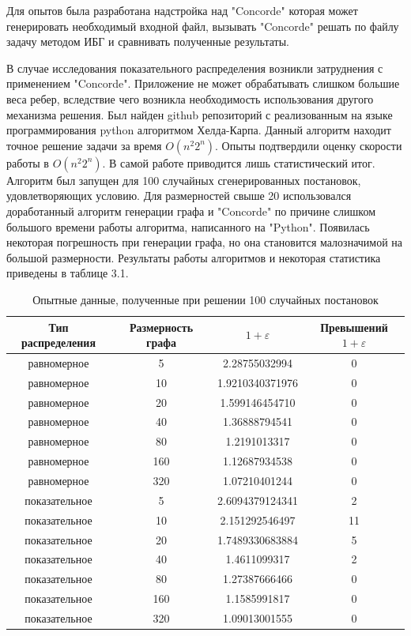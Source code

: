 \documentclass[a4paper, 14pt]{extarticle}
\numberwithin{equation}{section}
\begin{document}
Для опытов была разработана надстройка над "Concorde"  которая может генерировать необходимый входной файл, вызывать "Concorde"  решать по файлу задачу методом ИБГ и сравнивать полученные результаты.

В случае исследования показательного распределения возникли затруднения с применением "Concorde". Приложение не может обрабатывать слишком большие веса ребер, вследствие чего возникла необходимость использования другого механизма решения. Был найден github репозиторий с реализованным на языке программирования python алгоритмом Хелда-Карпа. Данный алгоритм находит точное решение задачи за время $O(n^2 2^n)$. Опыты подтвердили оценку скорости работы в $O(n^2 2^n)$. В самой работе приводится лишь статистический итог. Алгоритм был запущен для 100 случайных сгенерированных постановок, удовлетворяющих условию. Для размерностей свыше 20 использовался доработанный алгоритм генерации графа и "Concorde" по причине слишком большого времени работы алгоритма, написанного на "Python". Появилась некоторая погрешность при генерации графа, но она становится малозначимой на большой размерности. Результаты работы алгоритмов и некоторая статистика приведены в таблице 3.1.\\

\begin{table}
\caption{Опытные данные, полученные при решении 100 случайных постановок}
\begin{center}
 \begin{tabular}{||c | c | c | c||} 
 \hline
 Тип распределения & Размерность графа  & $1+\varepsilon$  & Превышений $1+\varepsilon$ \\ [0.5ex] 
 \hline\hline
 равномерное & 5 & 2.28755032994 & 0 \\ 
 \hline
 равномерное & 10 & 1.9210340371976 & 0 \\
 \hline
 равномерное & 20 & 1.599146454710 & 0 \\
 \hline
 равномерное & 40 & 1.36888794541 & 0 \\
 \hline
 равномерное & 80 & 1.2191013317 & 0 \\
 \hline
 равномерное & 160 & 1.12687934538 & 0 \\
 \hline
 равномерное & 320 & 1.07210401244 & 0 \\
 \hline
 показательное & 5 & 2.6094379124341 & 2 \\
 \hline
 показательное & 10 & 2.151292546497 & 11 \\
 \hline
 показательное & 20 & 1.7489330683884 & 5 \\ 
  \hline
 показательное & 40 & 1.4611099317 & 2 \\ 
  \hline
 показательное & 80 & 1.27387666466 & 0 \\ 
  \hline
 показательное & 160 & 1.1585991817 & 0 \\ 
 \hline
 показательное & 320 & 1.09013001555 & 0 \\[1ex] 
 \hline
\end{tabular}\\
\end{center}
\end{table}
\end{document}
